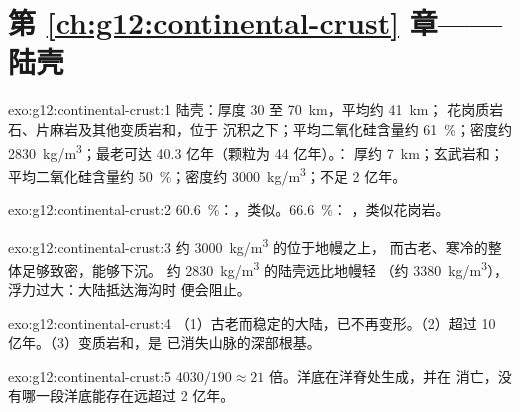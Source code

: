 \section*{第 \ref{ch:g12:continental-crust} 章——陆壳}

\begin{solution}{exo:g12:continental-crust:1}
陆壳：厚度 30 至 \qty{70}{km}，平均约 \qty{41}{km}；
花岗质岩石、片麻岩及其他变质岩和，位于
沉积之下；平均二氧化硅含量约 \qty{61}{\percent}；密度约
\qty{2830}{kg/m^3}；最老可达 40.3 亿年（颗粒为 44 亿年）。：
厚约 \qty{7}{km}；玄武岩和；平均二氧化硅含量约 \qty{50}{\percent}；密度约
\qty{3000}{kg/m^3}；不足 2 亿年。
\end{solution}

\begin{solution}{exo:g12:continental-crust:2}
\qty{60.6}{\percent}：，类似。\qty{66.6}{\percent}：
，类似花岗岩。
\end{solution}

\begin{solution}{exo:g12:continental-crust:3}
约 \qty{3000}{kg/m^3} 的位于地幔之上，
而古老、寒冷的整体足够致密，能够下沉。
约 \qty{2830}{kg/m^3} 的陆壳远比地幔轻
（约 \qty{3380}{kg/m^3}），浮力过大：大陆抵达海沟时
便会阻止。
\end{solution}

\begin{solution}{exo:g12:continental-crust:4}
（1）古老而稳定的大陆，已不再变形。（2）超过
10 亿年。（3）变质岩和，是
已消失山脉的深部根基。
\end{solution}

\begin{solution}{exo:g12:continental-crust:5}
$4030/190 \approx 21$ 倍。洋底在洋脊处生成，并在
消亡，没有哪一段洋底能存在远超过
2 亿年。
\end{solution}

